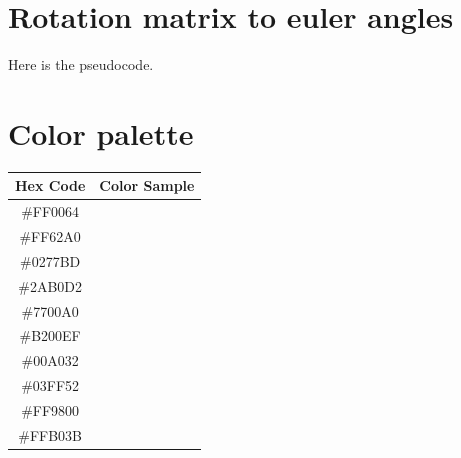 \section{Rotation matrix to euler angles}
Here \cite{euler_from_matrix} is the pseudocode.


\section{Color palette}
\begin{table}[h]
    \centering
    \renewcommand{\arraystretch}{1.5} %
    \setlength{\tabcolsep}{12pt} %
    \begin{tabular}{c c}
        \toprule
        \textbf{Hex Code} & \textbf{Color Sample} \\
        \midrule


        \#FF0064 & \cellcolor[HTML]{FF0064} \hspace{2cm} \\
        \#FF62A0 & \cellcolor[HTML]{FF62A0} \hspace{2cm} \\
        \#0277BD & \cellcolor[HTML]{0277BD} \hspace{2cm} \\
        \#2AB0D2 & \cellcolor[HTML]{2AB0D2} \hspace{2cm} \\
        \#7700A0 & \cellcolor[HTML]{7700A0} \hspace{2cm} \\
        \#B200EF & \cellcolor[HTML]{B200EF} \hspace{2cm} \\
        \#00A032 & \cellcolor[HTML]{00A032} \hspace{2cm} \\
        \#03FF52 & \cellcolor[HTML]{03FF52} \hspace{2cm} \\
        \#FF9800 & \cellcolor[HTML]{FF9800} \hspace{2cm} \\
        \#FFB03B & \cellcolor[HTML]{FFB03B} \hspace{2cm} \\


\end{tabular}
\end{table}
